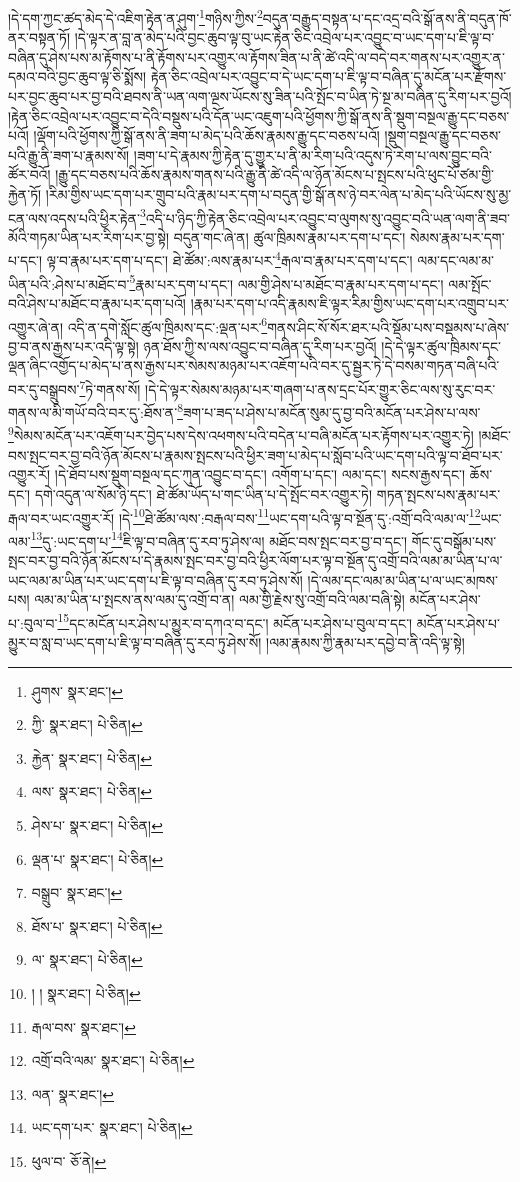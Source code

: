 །དེ་དག་ཀྱང་ཚད་མེད་དེ་འཇིག་རྟེན་ན་ཤུག་\footnote{ཤུགས་  སྣར་ཐང་། }གཉིས་ཀྱིས་\footnote{ཀྱི་  སྣར་ཐང་།  པེ་ཅིན། }བདུན་བརྒྱུད་བསྟན་པ་དང་འདྲ་བའི་སྒོ་ནས་ནི་བདུན་ཁོ་ནར་བསྟན་ཏོ། །དེ་ལྟར་ན་བླ་ན་མེད་པའི་བྱང་ཆུབ་ལྟ་བུ་ཡང་རྟེན་ཅིང་འབྲེལ་པར་འབྱུང་བ་ཡང་དག་པ་ཇི་ལྟ་བ་བཞིན་དུ་ཤེས་པས་མ་རྟོགས་པ་ནི་རྟོགས་པར་འགྱུར་ལ་རྟོགས་ཟིན་པ་ནི་ཚེ་འདི་ལ་བདེ་བར་གནས་པར་འགྱུར་ན་དམའ་བའི་བྱང་ཆུབ་ལྟ་ཅི་སྨོས། རྟེན་ཅིང་འབྲེལ་པར་འབྱུང་བ་དེ་ཡང་དག་པ་ཇི་ལྟ་བ་བཞིན་དུ་མངོན་པར་རྫོགས་པར་བྱང་ཆུབ་པར་བྱ་བའི་ཐབས་ནི་ཡན་ལག་ལྔས་ཡོངས་སུ་ཟིན་པའི་སྤོང་བ་ཡིན་ཏེ་སྔ་མ་བཞིན་དུ་རིག་པར་བྱའོ། །རྟེན་ཅིང་འབྲེལ་པར་འབྱུང་བ་དེའི་བསྡུས་པའི་དོན་ཡང་འཇུག་པའི་ཕྱོགས་ཀྱི་སྒོ་ནས་ནི་སྡུག་བསྔལ་རྒྱུ་དང་བཅས་པའོ། །ལྡོག་པའི་ཕྱོགས་ཀྱི་སྒོ་ནས་ནི་ཟག་པ་མེད་པའི་ཆོས་རྣམས་རྒྱུ་དང་བཅས་པའོ། །སྡུག་བསྔལ་རྒྱུ་དང་བཅས་པའི་རྒྱུ་ནི་ཟག་པ་རྣམས་སོ། །ཟག་པ་དེ་རྣམས་ཀྱི་རྟེན་དུ་གྱུར་པ་ནི་མ་རིག་པའི་འདུས་ཏེ་རེག་པ་ལས་བྱུང་བའི་ཚོར་བའོ། །རྒྱུ་དང་བཅས་པའི་ཆོས་རྣམས་གནས་པའི་རྒྱུ་ནི་ཚེ་འདི་ལ་ཉོན་མོངས་པ་སྤངས་པའི་ཕུང་པོ་ཙམ་གྱི་རྐྱེན་ཏོ། །རིམ་གྱིས་ཡང་དག་པར་གྲུབ་པའི་རྣམ་པར་དག་པ་བདུན་གྱི་སྒོ་ནས་ཉེ་བར་ལེན་པ་མེད་པའི་ཡོངས་སུ་མྱ་ངན་ལས་འདས་པའི་ཕྱིར་རྟེན་\footnote{རྐྱེན་  སྣར་ཐང་།  པེ་ཅིན། }འདི་པ་ཉིད་ཀྱི་རྟེན་ཅིང་འབྲེལ་པར་འབྱུང་བ་ལུགས་སུ་འབྱུང་བའི་ཡན་ལག་ནི་ཟབ་མོའི་གཏམ་ཡིན་པར་རིག་པར་བྱ་སྟེ། བདུན་གང་ཞེ་ན། ཚུལ་ཁྲིམས་རྣམ་པར་དག་པ་དང་། སེམས་རྣམ་པར་དག་པ་དང་། ལྟ་བ་རྣམ་པར་དག་པ་དང་། ཐེ་ཚོམ་:ལས་རྣམ་པར་\footnote{ལས་  སྣར་ཐང་།  པེ་ཅིན། }རྒལ་བ་རྣམ་པར་དག་པ་དང་། ལམ་དང་ལམ་མ་ཡིན་པའི་:ཤེས་པ་མཐོང་བ་\footnote{ཤེས་པ་  སྣར་ཐང་།  པེ་ཅིན། }རྣམ་པར་དག་པ་དང་། ལམ་གྱི་ཤེས་པ་མཐོང་བ་རྣམ་པར་དག་པ་དང་། ལམ་སྤོང་བའི་ཤེས་པ་མཐོང་བ་རྣམ་པར་དག་པའོ། །རྣམ་པར་དག་པ་འདི་རྣམས་ཇི་ལྟར་རིམ་གྱིས་ཡང་དག་པར་འགྲུབ་པར་འགྱུར་ཞེ་ན། འདི་ན་དགེ་སློང་ཚུལ་ཁྲིམས་དང་:ལྡན་པར་\footnote{ལྡན་པ་  སྣར་ཐང་།  པེ་ཅིན། }གནས་ཤིང་སོ་སོར་ཐར་པའི་སྡོམ་པས་བསྡམས་པ་ཞེས་བྱ་བ་ནས་རྒྱས་པར་འདི་ལྟ་སྟེ། ཉན་ཐོས་ཀྱི་ས་ལས་འབྱུང་བ་བཞིན་དུ་རིག་པར་བྱའོ། །དེ་དེ་ལྟར་ཚུལ་ཁྲིམས་དང་ལྡན་ཞིང་འགྱོད་པ་མེད་པ་ནས་རྒྱས་པར་སེམས་མཉམ་པར་འཇོག་པའི་བར་དུ་སྦྱར་ཏེ་དེ་བསམ་གཏན་བཞི་པའི་བར་དུ་བསྒྲུབས་\footnote{བསྒྲུབ་  སྣར་ཐང་། }ཏེ་གནས་སོ། །དེ་དེ་ལྟར་སེམས་མཉམ་པར་གཞག་པ་ནས་དྲང་པོར་གྱུར་ཅིང་ལས་སུ་རུང་བར་གནས་ལ་མི་གཡོ་བའི་བར་དུ་:ཐོས་ན་\footnote{ཐོས་པ་  སྣར་ཐང་།  པེ་ཅིན། }ཟག་པ་ཟད་པ་ཤེས་པ་མངོན་སུམ་དུ་བྱ་བའི་མངོན་པར་ཤེས་པ་ལས་\footnote{ལ་  སྣར་ཐང་།  པེ་ཅིན། }སེམས་མངོན་པར་འཇོག་པར་བྱེད་པས་དེས་འཕགས་པའི་བདེན་པ་བཞི་མངོན་པར་རྟོགས་པར་འགྱུར་ཏེ། །མཐོང་བས་སྤང་བར་བྱ་བའི་ཉོན་མོངས་པ་རྣམས་སྤངས་པའི་ཕྱིར་ཟག་པ་མེད་པ་སློབ་པའི་ཡང་དག་པའི་ལྟ་བ་ཐོབ་པར་འགྱུར་རོ། །དེ་ཐོབ་པས་སྡུག་བསྔལ་དང་ཀུན་འབྱུང་བ་དང་། འགོག་པ་དང་། ལམ་དང་། སངས་རྒྱས་དང་། ཆོས་དང་། དགེ་འདུན་ལ་སོམ་ཉི་དང་། ཐེ་ཚོམ་ཡོད་པ་གང་ཡིན་པ་དེ་སྤོང་བར་འགྱུར་ཏེ། གཏན་སྤངས་པས་རྣམ་པར་རྒལ་བར་ཡང་འགྱུར་རོ། །དེ་\footnote{། །  སྣར་ཐང་།  པེ་ཅིན། }ཐེ་ཚོམ་ལས་:བརྒལ་བས་\footnote{རྒལ་བས་  སྣར་ཐང་། }ཡང་དག་པའི་ལྟ་བ་སྔོན་དུ་:འགྲོ་བའི་ལམ་ལ་\footnote{འགྲོ་བའི་ལམ་  སྣར་ཐང་།  པེ་ཅིན། }ཡང་ལམ་\footnote{ལན་  སྣར་ཐང་། }དུ་:ཡང་དག་པ་\footnote{ཡང་དག་པར་  སྣར་ཐང་།  པེ་ཅིན། }ཇི་ལྟ་བ་བཞིན་དུ་རབ་ཏུ་ཤེས་ལ། མཐོང་བས་སྤང་བར་བྱ་བ་དང་། གོང་དུ་བསྒོམ་པས་སྤང་བར་བྱ་བའི་ཉོན་མོངས་པ་དེ་རྣམས་སྤང་བར་བྱ་བའི་ཕྱིར་ལོག་པར་ལྟ་བ་སྔོན་དུ་འགྲོ་བའི་ལམ་མ་ཡིན་པ་ལ་ཡང་ལམ་མ་ཡིན་པར་ཡང་དག་པ་ཇི་ལྟ་བ་བཞིན་དུ་རབ་ཏུ་ཤེས་སོ། །དེ་ལམ་དང་ལམ་མ་ཡིན་པ་ལ་ཡང་མཁས་པས། ལམ་མ་ཡིན་པ་སྤངས་ནས་ལམ་དུ་འགྲོ་བ་ན། ལམ་གྱི་རྗེས་སུ་འགྲོ་བའི་ལམ་བཞི་སྟེ། མངོན་པར་ཤེས་པ་:བུལ་བ་\footnote{ཕུལ་བ་  ཅོ་ནེ། }དང་མངོན་པར་ཤེས་པ་མྱུར་བ་དཀའ་བ་དང་། མངོན་པར་ཤེས་པ་བུལ་བ་དང་། མངོན་པར་ཤེས་པ་མྱུར་བ་སླ་བ་ཡང་དག་པ་ཇི་ལྟ་བ་བཞིན་དུ་རབ་ཏུ་ཤེས་སོ། །ལམ་རྣམས་ཀྱི་རྣམ་པར་དབྱེ་བ་ནི་འདི་ལྟ་སྟེ། 